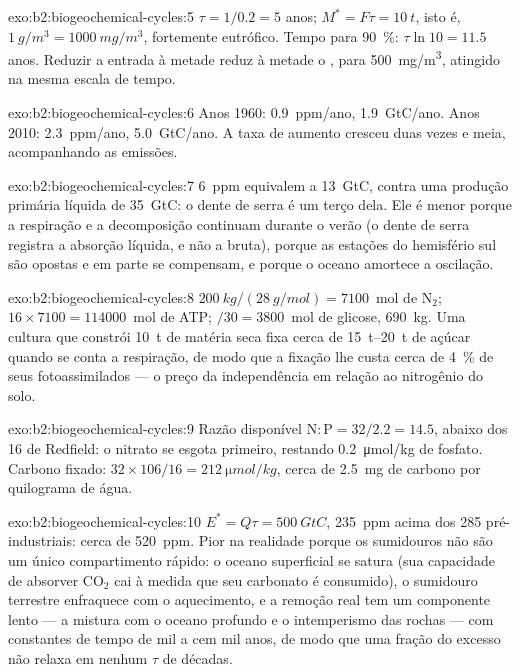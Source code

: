 \begin{solution}{exo:b2:biogeochemical-cycles:5}
$\tau = 1/0.2 = 5$ anos; $M^{*} = F\tau = \qty{10}{t}$, isto é,
$\qty{1}{g/m^3} = \qty{1000}{mg/m^3}$, fortemente eutrófico. Tempo para
\qty{90}{\%}: $\tau\ln 10 = 11.5$ anos. Reduzir a entrada à metade
reduz à metade o , para \qty{500}{mg/m^3}, atingido na
mesma escala de tempo.
\end{solution}

\begin{solution}{exo:b2:biogeochemical-cycles:6}
Anos 1960: \qty{0.9}{ppm/ano}, \qty{1.9}{GtC/ano}. Anos 2010: \qty{2.3}{ppm/ano},
\qty{5.0}{GtC/ano}. A taxa de aumento cresceu duas vezes e meia,
acompanhando as emissões.
\end{solution}

\begin{solution}{exo:b2:biogeochemical-cycles:7}
\qty{6}{ppm} equivalem a \qty{13}{GtC}, contra uma produção primária
líquida de \qty{35}{GtC}: o dente de serra é um terço dela. Ele é menor
porque a respiração e a decomposição continuam durante o verão (o dente
de serra registra a absorção líquida, e não a bruta), porque as estações
do hemisfério sul são opostas e em parte se compensam, e porque o oceano
amortece a oscilação.
\end{solution}

\begin{solution}{exo:b2:biogeochemical-cycles:8}
$\qty{200}{kg}/(\qty{28}{g/mol}) = 7100$~mol de $\mathrm{N_2}$; $16\times
7100 = \num{114000}$~mol de ATP; $/30 = 3800$~mol de glicose, \qty{690}{kg}.
Uma cultura que constrói \qty{10}{t} de matéria seca fixa cerca de
\qtyrange{15}{20}{t} de açúcar quando se conta a respiração, de modo que
a fixação lhe custa cerca de \qty{4}{\%} de seus fotoassimilados --- o
preço da independência em relação ao nitrogênio do solo.
\end{solution}

\begin{solution}{exo:b2:biogeochemical-cycles:9}
Razão disponível $\mathrm{N:P} = 32/2.2 = 14.5$, abaixo dos 16 de
Redfield: o nitrato se esgota primeiro, restando \qty{0.2}{\micro mol/kg}
de fosfato. Carbono fixado: $32\times 106/16 =
\qty{212}{\micro mol/kg}$, cerca de \qty{2.5}{mg} de carbono por
quilograma de água.
\end{solution}

\begin{solution}{exo:b2:biogeochemical-cycles:10}
$E^{*} = Q\tau = \qty{500}{GtC}$, \qty{235}{ppm} acima dos 285
pré-industriais: cerca de \qty{520}{ppm}. Pior na realidade porque os
sumidouros não são um único compartimento rápido: o oceano superficial
se satura (sua capacidade de absorver $\mathrm{CO_2}$ cai à medida que seu
carbonato é consumido), o sumidouro terrestre enfraquece com o
aquecimento, e a remoção real tem um componente lento --- a mistura com o
oceano profundo e o intemperismo das rochas --- com constantes de tempo
de mil a cem mil anos, de modo que uma fração do excesso não relaxa em
nenhum $\tau$ de décadas.
\end{solution}

